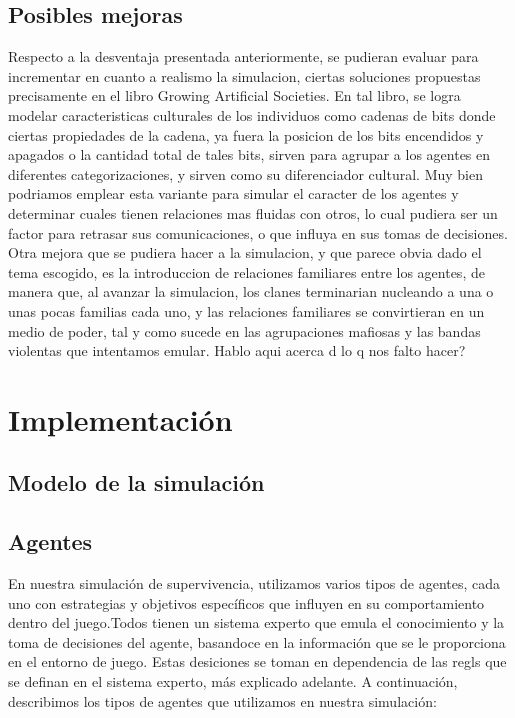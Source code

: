 \documentclass[11pt]{article}
\begin{document}
\subsection{Posibles mejoras}
Respecto a la desventaja presentada anteriormente, se pudieran evaluar para incrementar en cuanto a realismo la simulacion, ciertas soluciones propuestas precisamente en el libro Growing Artificial Societies. En tal libro, se logra modelar caracteristicas culturales de los individuos como cadenas de bits donde ciertas propiedades de la cadena, ya fuera la posicion de los bits encendidos y apagados o la cantidad total de tales bits, sirven para agrupar a los agentes en diferentes categorizaciones, y sirven como su diferenciador cultural. Muy bien podriamos emplear esta variante para simular el caracter de los agentes y determinar cuales tienen relaciones mas fluidas con otros, lo cual pudiera ser un factor para retrasar sus comunicaciones, o que influya en sus tomas de decisiones.
Otra mejora que se pudiera hacer a la simulacion, y que parece obvia dado el tema escogido, es la introduccion de relaciones familiares entre los agentes, de manera que, al avanzar la simulacion, los clanes terminarian nucleando a una o unas pocas familias cada uno, y las relaciones familiares se convirtieran en un medio de poder, tal y como sucede en las agrupaciones mafiosas y las bandas violentas que intentamos emular.
Hablo aqui acerca d lo q nos falto hacer?

\section{Implementación}
\subsection{Modelo de la simulación}
\subsection{Agentes}
En nuestra simulación de supervivencia, utilizamos varios tipos de agentes, cada uno con estrategias y objetivos específicos que influyen en su comportamiento dentro del juego.Todos tienen un sistema experto que emula el conocimiento y la toma de decisiones del agente,
basandoce en la información que se le proporciona en el entorno de juego. Estas desiciones se toman en dependencia de las regls que se definan en el sistema experto, más explicado adelante. A continuación, describimos los tipos de agentes que utilizamos en nuestra simulación:
\end{document}
